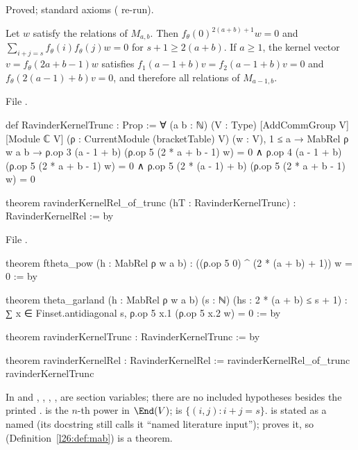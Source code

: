 \begin{status}
Proved; standard axioms ( re-run).
\end{status}

\begin{theorem}\label{l26:thm:kernelA2}
Let $w$ satisfy the relations of $M_{a,b}$. Then $f_\theta(0)^{2(a+b)+1}w=0$ and
$\sum_{i+j=s}f_\theta(i)f_\theta(j)w=0$ for $s+1\ge2(a+b)$. If $a\ge1$, the kernel vector $v=f_\theta(2a+b-1)w$ satisfies
$f_1(a-1+b)v=f_2(a-1+b)v=0$ and $f_\theta(2(a-1)+b)v=0$, and therefore all relations of $M_{a-1,b}$.
\end{theorem}
\noindent File .
\begin{leancode}
def RavinderKernelTrunc : Prop :=
  ∀ (a b : ℕ) (V : Type) [AddCommGroup V] [Module ℂ V] (ρ : CurrentModule (bracketTable) V) (w : V),
    1 ≤ a → MabRel ρ w a b →
      ρ.op 3 (a - 1 + b) (ρ.op 5 (2 * a + b - 1) w) = 0 ∧
      ρ.op 4 (a - 1 + b) (ρ.op 5 (2 * a + b - 1) w) = 0 ∧
      ρ.op 5 (2 * (a - 1) + b) (ρ.op 5 (2 * a + b - 1) w) = 0

theorem ravinderKernelRel_of_trunc (hT : RavinderKernelTrunc) : RavinderKernelRel := by
\end{leancode}
\noindent File .
\begin{leancode}
theorem ftheta_pow (h : MabRel ρ w a b) : ((ρ.op 5 0) ^ (2 * (a + b) + 1)) w = 0 := by

theorem theta_garland (h : MabRel ρ w a b) (s : ℕ) (hs : 2 * (a + b) ≤ s + 1) :
    ∑ x ∈ Finset.antidiagonal s, ρ.op 5 x.1 (ρ.op 5 x.2 w) = 0 := by

theorem ravinderKernelTrunc : RavinderKernelTrunc := by

theorem ravinderKernelRel : RavinderKernelRel := ravinderKernelRel_of_trunc ravinderKernelTrunc
\end{leancode}

\begin{dictionary}
In  and , , , ,  are section variables; there are no
included hypotheses besides the printed .  is the $n$-th power in
$\End(V)$;  is $\{(i,j):i+j=s\}$.  is stated as a named 
(its docstring still calls it ``named literature input'');  proves it, so
 (Definition~\ref{l26:def:mab}) is a theorem.
\end{dictionary}

